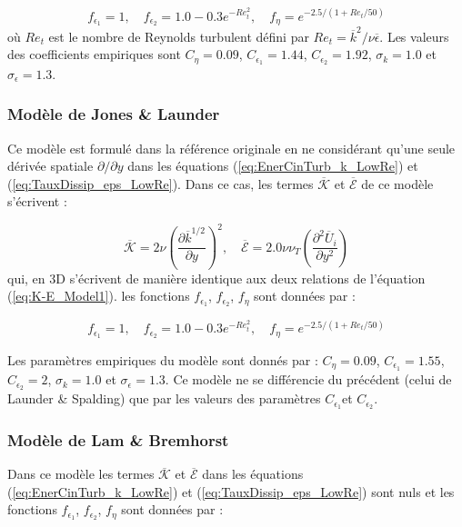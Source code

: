 \[
f_{\epsilon_{1}}=1,\quad f_{\epsilon_{2}}=1.0-0.3e^{-Re_{t}^{2}},\quad f_{\eta}=e^{-2.5/(1+Re_{t}/50)}
\]
o\`u $Re_{t}$ est le nombre de Reynolds turbulent d\'efini par $Re_{t}=\overline{k}^{2}/\nu\overline{\epsilon}$.
Les valeurs des coefficients empiriques sont $C_{\eta}=0.09$, $C_{\epsilon_{1}}=1.44$,
$C_{\epsilon_{2}}=1.92$, $\sigma_{k}=1.0$ et $\sigma_{\epsilon}=1.3$.


\subsubsection*{Mod\`ele de Jones \& Launder \cite{Jones-Launder_IJHMT1972}}

Ce mod\`ele est formul\'e dans la r\'ef\'erence originale \cite{Jones-Launder_IJHMT1972}
en ne consid\'erant qu'une seule d\'eriv\'ee spatiale $\partial/\partial y$
dans les \'equations (\ref{eq:EnerCinTurb_k_LowRe}) et (\ref{eq:TauxDissip_eps_LowRe}).
Dans ce cas, les termes $\overline{\mathcal{K}}$ et $\overline{\mathcal{E}}$
de ce mod\`ele s'\'ecrivent \cite[Eqs. (8) et (9)]{Jones-Launder_IJHMT1972}
:

\[
\overline{\mathcal{K}}=2\nu\left(\frac{\partial\overline{k}^{1/2}}{\partial y}\right)^{2},\quad\overline{\mathcal{E}}=2.0\nu\nu_{T}\left(\frac{\partial^{2}\overline{U}_{i}}{\partial y^{2}}\right)
\]
qui, en 3D s'\'ecrivent de mani\`ere identique aux deux relations de l'\'equation
(\ref{eq:K-E_Model1}). les fonctions $f_{\epsilon_{1}}$, $f_{\epsilon_{2}}$,
$f_{\eta}$ sont donn\'ees par \cite[Eq. (12)]{Jones-Launder_IJHMT1972}
:

\[
f_{\epsilon_{1}}=1,\quad f_{\epsilon_{2}}=1.0-0.3e^{-Re_{t}^{2}},\quad f_{\eta}=e^{-2.5/(1+Re_{t}/50)}
\]


Les param\`etres empiriques du mod\`ele sont donn\'es par \cite[Table 1]{Jones-Launder_IJHMT1972}
: $C_{\eta}=0.09$, $C_{\epsilon_{1}}=1.55$, $C_{\epsilon_{2}}=2$,
$\sigma_{k}=1.0$ et $\sigma_{\epsilon}=1.3$. Ce mod\`ele ne se diff\'erencie
du pr\'ec\'edent (celui de Launder \& Spalding) que par les valeurs des
param\`etres $C_{\epsilon_{1}}$et $C_{\epsilon_{2}}$.


\subsubsection*{Mod\`ele de Lam \& Bremhorst \cite{Lam-Bremhorst_JFE1981}}

Dans ce mod\`ele les termes $\overline{\mathcal{K}}$ et $\overline{\mathcal{E}}$
dans les \'equations (\ref{eq:EnerCinTurb_k_LowRe}) et (\ref{eq:TauxDissip_eps_LowRe})
sont nuls et les fonctions $f_{\epsilon_{1}}$, $f_{\epsilon_{2}}$,
$f_{\eta}$ sont donn\'ees par \cite[Eq. (11), (12) et (13)]{Lam-Bremhorst_JFE1981}
:

